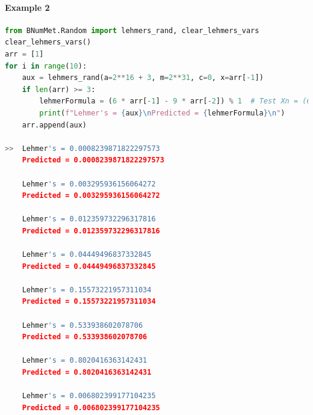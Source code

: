 \paragraph{Example 2}{
\begin{lstlisting}[language=Python]
from BNumMet.Random import lehmers_rand, clear_lehmers_vars
clear_lehmers_vars()
arr = [1]
for i in range(10):
    aux = lehmers_rand(a=2**16 + 3, m=2**31, c=0, x=arr[-1])
    if len(arr) >= 3:
        lehmerFormula = (6 * arr[-1] - 9 * arr[-2]) % 1  # Test Xn = (6Xn-1 - 9Xn-2)
        print(f"Lehmer's = {aux}\nPredicted = {lehmerFormula}\n")
    arr.append(aux)

>>  Lehmer's = 0.0008239871822297573
    Predicted = 0.0008239871822297573
    
    Lehmer's = 0.003295936156064272
    Predicted = 0.003295936156064272
    
    Lehmer's = 0.012359732296317816
    Predicted = 0.012359732296317816
    
    Lehmer's = 0.04449496837332845
    Predicted = 0.04449496837332845
    
    Lehmer's = 0.15573221957311034
    Predicted = 0.15573221957311034
    
    Lehmer's = 0.533938602078706
    Predicted = 0.533938602078706
    
    Lehmer's = 0.8020416363142431
    Predicted = 0.8020416363142431
    
    Lehmer's = 0.006802399177104235
    Predicted = 0.006802399177104235
\end{lstlisting}
}
